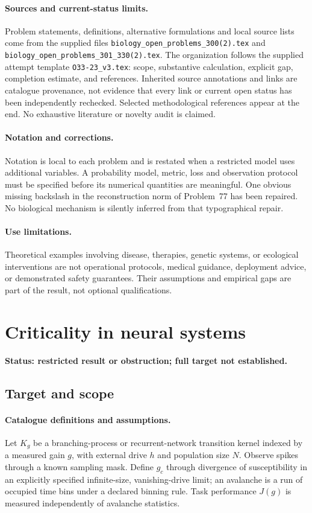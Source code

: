 \documentclass[11pt]{article}
\begin{document}
\paragraph{Sources and current-status limits.}
Problem statements, definitions, alternative formulations and local source lists
come from the supplied files
\texttt{biology\_open\_problems\_300(2).tex} and
\texttt{biology\_open\_problems\_301\_330(2).tex}.
The organization follows the supplied attempt template
\texttt{O33-23\_v3.tex}: scope, substantive calculation, explicit gap,
completion estimate, and references. Inherited source annotations and links are
catalogue provenance, not evidence that every link or current open status has
been independently rechecked. Selected methodological references appear at the
end. No exhaustive literature or novelty audit is claimed.

\paragraph{Notation and corrections.}
Notation is local to each problem and is restated when a restricted model uses
additional variables. A probability model, metric, loss and observation protocol
must be specified before its numerical quantities are meaningful. One obvious
missing backslash in the reconstruction norm of Problem~77 has been repaired.
No biological mechanism is silently inferred from that typographical repair.

\paragraph{Use limitations.}
Theoretical examples involving disease, therapies, genetic systems, or ecological
interventions are not operational protocols, medical guidance, deployment advice,
or demonstrated safety guarantees. Their assumptions and empirical gaps are part
of the result, not optional qualifications.


\section*{Criticality in neural systems}
\label{prob:108}
\noindent\textbf{Status: restricted result or obstruction; full target not established.}
\subsection{Target and scope}
\paragraph{Catalogue definitions and assumptions.}
Let $K_g$ be a branching-process or recurrent-network transition kernel indexed by a measured gain $g$, with external drive $h$ and population size $N$. Observe spikes through a known sampling mask. Define $g_c$ through divergence of susceptibility in an explicitly specified infinite-size, vanishing-drive limit; an avalanche is a run of occupied time bins under a declared binning rule. Task performance $J(g)$ is measured independently of avalanche statistics.
\end{document}
